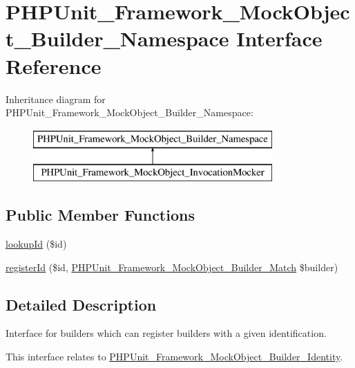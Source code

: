 \hypertarget{interface_p_h_p_unit___framework___mock_object___builder___namespace}{}\section{P\+H\+P\+Unit\+\_\+\+Framework\+\_\+\+Mock\+Object\+\_\+\+Builder\+\_\+\+Namespace Interface Reference}
\label{interface_p_h_p_unit___framework___mock_object___builder___namespace}
Inheritance diagram for P\+H\+P\+Unit\+\_\+\+Framework\+\_\+\+Mock\+Object\+\_\+\+Builder\+\_\+\+Namespace\+:\begin{figure}[H]
\begin{center}
\leavevmode
\includegraphics[height=2.000000cm]{interface_p_h_p_unit___framework___mock_object___builder___namespace}
\end{center}
\end{figure}
\subsection*{Public Member Functions}
\begin{DoxyCompactItemize}
\item 
\mbox{\hyperlink{interface_p_h_p_unit___framework___mock_object___builder___namespace_a1618f99693f7303270b2c569fdd602d4}{lookup\+Id}} (\$id)
\item 
\mbox{\hyperlink{interface_p_h_p_unit___framework___mock_object___builder___namespace_a538bdd6eae589613c28cf0da0243a4d4}{register\+Id}} (\$id, \mbox{\hyperlink{interface_p_h_p_unit___framework___mock_object___builder___match}{P\+H\+P\+Unit\+\_\+\+Framework\+\_\+\+Mock\+Object\+\_\+\+Builder\+\_\+\+Match}} \$builder)
\end{DoxyCompactItemize}


\subsection{Detailed Description}
Interface for builders which can register builders with a given identification.

This interface relates to \mbox{\hyperlink{interface_p_h_p_unit___framework___mock_object___builder___identity}{P\+H\+P\+Unit\+\_\+\+Framework\+\_\+\+Mock\+Object\+\_\+\+Builder\+\_\+\+Identity}}.

